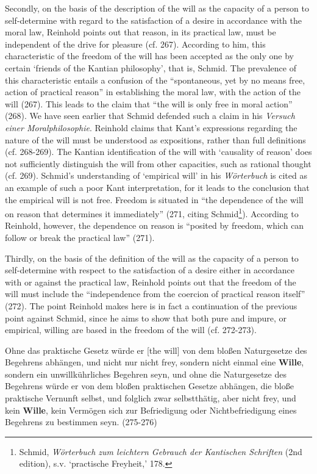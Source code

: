  Secondly, on the basis of the description of the will as the capacity of a person to self{-}determine with regard to the satisfaction of a desire in accordance with the moral law, Reinhold points out that reason, in its practical law, must be independent of the drive for pleasure (cf. 267). According to him, this characteristic of the freedom of the will has been accepted as the only one by certain `friends of the Kantian philosophy', that is, Schmid. The prevalence of this characteristic entails a confusion of the ``spontaneous, yet by no means free, action of practical reason'' in establishing the moral law, with the action of the will (267). This leads to the claim that ``the will is only free in moral action'' (268). We have seen earlier that Schmid defended such a claim in his \textit{Versuch einer Moralphilosophie}. Reinhold claims that Kant's expressions regarding the nature of the will must be understood as expositions, rather than full definitions (cf. 268{-}269). The Kantian identification of the will with `causality of reason' does not sufficiently distinguish the will from other capacities, such as rational thought (cf. 269). Schmid's understanding of `empirical will' in his \textit{W\"{o}rterbuch} is cited as an example of such a poor Kant interpretation, for it leads to the conclusion that the empirical will is not free. Freedom is situated in ``the dependence of the will on reason that determines it immediately'' (271, citing Schmid\footnote{ Schmid, \textit{W\"{o}rterbuch zum leichtern Gebrauch der Kantischen Schriften} (2nd edition), s.v. `practische Freyheit,' 178.}). According to Reinhold, however, the dependence on reason is ``posited by freedom, which can follow or break the practical law'' (271). 

 Thirdly, on the basis of the definition of the will as the capacity of a person to self{-}determine with respect to the satisfaction of a desire either in accordance with or against the practical law, Reinhold points out that the freedom of the will must include the ``independence from the coercion of practical reason itself'' (272). The point Reinhold makes here is in fact a continuation of the previous point against Schmid, since he aims to show that both pure and impure, or empirical, willing are based in the freedom of the will (cf. 272{-}273). 

Ohne das praktische Gesetz w\"{u}rde er [the will] von dem blo\ss{}en Naturgesetze des Begehrens abh\"{a}ngen, und nicht nur nicht frey, sondern nicht einmal eine \textbf{Wille}, sondern ein unwillk\"{u}hrliches Begehren seyn, und ohne die Naturgesetze des Begehrens w\"{u}rde er von dem blo\ss{}en praktischen Gesetze abh\"{a}ngen, die blo\ss{}e praktische Vernunft selbst, und folglich zwar selbstth\"{a}tig, aber nicht frey, und kein \textbf{Wille}, kein Verm\"{o}gen sich zur Befriedigung oder Nichtbefriedigung eines Begehrens zu bestimmen seyn. (275{-}276)

